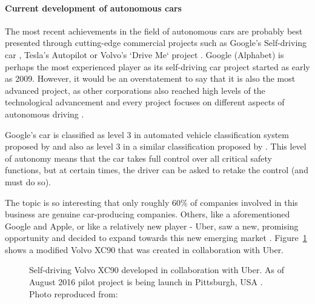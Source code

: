 \documentclass[11pt,english]{article}
\begin{document}



\paragraph{Current development of autonomous cars}

The most recent achievements in the field of autonomous cars are probably best presented through cutting-edge commercial projects such as Google's Self-driving car \citep{google1}, Tesla's Autopilot \citep{tesla1} or Volvo's `Drive Me` project \citep{volvo1}. Google (Alphabet) is perhaps the most experienced player as its self-driving car project started as early as 2009. However, it would be an overstatement to say that it is also the most advanced project, as other corporations also reached high levels of the technological advancement and every project focuses on different aspects of autonomous driving \citep{33comp}. 
\par
Google's car is classified as level 3 in automated vehicle classification system proposed by \citet{nhtsa1} and also as level 3 in a similar classification proposed by \citet{sae1}. This level of autonomy means that the car takes full control over all critical safety functions, but at certain times, the driver can be asked to retake the control (and must do so).  
\par
The topic is so interesting that only roughly 60\% of companies involved in this business are genuine car-producing companies. Others, like a aforementioned Google and Apple, or like a relatively new player  - Uber, saw a new, promising opportunity and decided to expand towards this new emerging market \citep{33comp}. Figure~\ref{fig:volvo} shows a modified Volvo XC90 that was created in collaboration with Uber.

\begin{figure}[!] %
\caption{Self-driving Volvo XC90 developed in collaboration with Uber. As of August 2016 pilot project is being launch in Pittsburgh, USA \citep{uberpittsburgh}. Photo reproduced from: \citet{volvo1}}
\label{fig:volvo}
\end{figure} 
\end{document}
